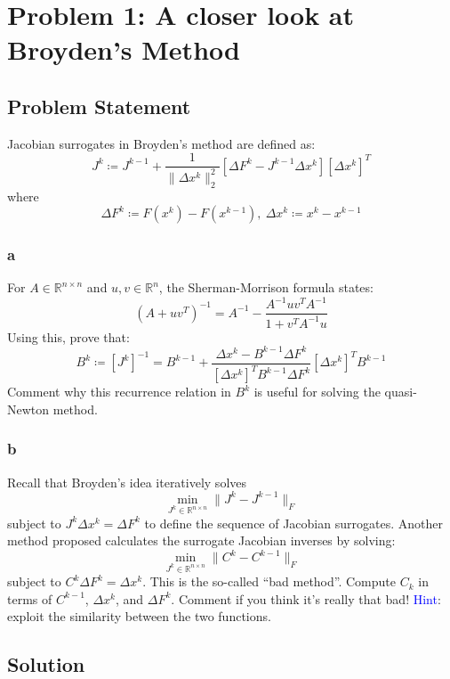 \documentclass[11pt]{report}
\theoremstyle{definition}
\begin{document}
\section*{Problem 1: A closer look at Broyden's Method}
\subsection*{Problem Statement}

Jacobian surrogates in Broyden's method are defined as:
\[
	J^{k} \coloneqq J^{k-1} + \frac{1}{\|\Delta x^k\|_2^2}\left[
		\Delta F^k - J^{k-1}\Delta x^k
		\right]
	\left[\Delta x^k\right]^T
\]
where
\[\Delta F^k\coloneqq F(x^k)-F(x^{k-1}),\ \Delta x^k\coloneqq x^k-x^{k-1}\]

\subsubsection*{a}
For $A\in\mathbb{R}^{n\times n}$ and $u,v\in\mathbb{R}^n$, the Sherman-Morrison
formula states:
\[
	\left(
	A+uv^{T}
	\right)^{-1}
	=
	A^{-1}-\frac{A^{-1}uv^{T}A^{-1}}{1+v^TA^{-1}u}
\]
Using this, prove that:
\[
	B^{k}
	\coloneqq \left[J^k\right]^{-1}
	= B^{k-1}+\frac{\Delta x^k-B^{k-1}\Delta F^{k}}{\left[\Delta x^k\right]^TB^{k-1}\Delta F^{k}}
	\left[\Delta x^k\right]^{T} B^{k-1}
\]
Comment why this recurrence relation in $B^k$ is useful for solving the quasi-Newton
method.

\subsubsection*{b}
Recall that Broyden's idea iteratively solves
\[
	\min_{J^k\in\mathbb{R}^{n\times n}}\|J^k-J^{k-1}\|_{F}
\]
subject to $J^k\Delta x^k = \Delta F^k$ to define the sequence of Jacobian surrogates.
Another method proposed calculates the surrogate Jacobian inverses by solving:
\[
	\min_{J^k\in\mathbb{R}^{n\times n}}\|C^k-C^{k-1}\|_{F}
\]
subject to $C^k\Delta F^{k} = \Delta x^k$. This is the so-called ``bad method''. Compute
$C_k$ in terms of $C^{k-1}$, $\Delta x^k$, and $\Delta F^k$. Comment if you think it's really that bad!
\textcolor{blue}{Hint}: exploit the similarity between the two functions.

\subsection*{Solution}
\end{document}
